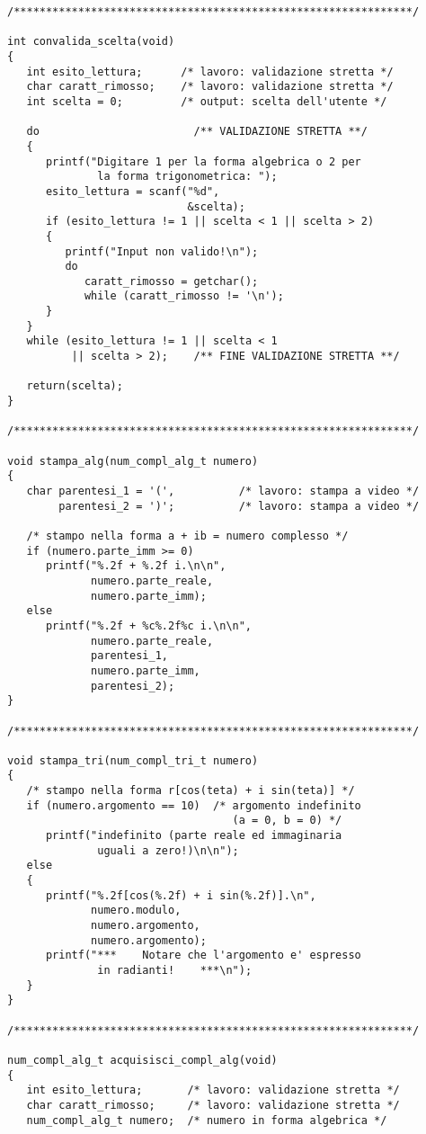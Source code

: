 \documentclass[a4paper,10pt]{article}
\begin{document}
\begin{verbatim}
/**************************************************************/

int convalida_scelta(void)
{
   int esito_lettura;      /* lavoro: validazione stretta */
   char caratt_rimosso;    /* lavoro: validazione stretta */
   int scelta = 0;         /* output: scelta dell'utente */

   do                        /** VALIDAZIONE STRETTA **/
   {
      printf("Digitare 1 per la forma algebrica o 2 per
              la forma trigonometrica: ");
      esito_lettura = scanf("%d",
                            &scelta);
      if (esito_lettura != 1 || scelta < 1 || scelta > 2)
      {
         printf("Input non valido!\n");
         do
            caratt_rimosso = getchar();
            while (caratt_rimosso != '\n');
      }
   }
   while (esito_lettura != 1 || scelta < 1
          || scelta > 2);    /** FINE VALIDAZIONE STRETTA **/

   return(scelta);
}

/**************************************************************/

void stampa_alg(num_compl_alg_t numero)
{
   char parentesi_1 = '(',          /* lavoro: stampa a video */
        parentesi_2 = ')';          /* lavoro: stampa a video */
	
   /* stampo nella forma a + ib = numero complesso */
   if (numero.parte_imm >= 0)
      printf("%.2f + %.2f i.\n\n",
             numero.parte_reale,
             numero.parte_imm);
   else
      printf("%.2f + %c%.2f%c i.\n\n",
             numero.parte_reale,
             parentesi_1,
             numero.parte_imm,
             parentesi_2);
}

/**************************************************************/

void stampa_tri(num_compl_tri_t numero)
{
   /* stampo nella forma r[cos(teta) + i sin(teta)] */
   if (numero.argomento == 10)	/* argomento indefinito
                                   (a = 0, b = 0) */
      printf("indefinito (parte reale ed immaginaria
              uguali a zero!)\n\n");
   else
   {
      printf("%.2f[cos(%.2f) + i sin(%.2f)].\n",
             numero.modulo,
             numero.argomento,
             numero.argomento);
      printf("***    Notare che l'argomento e' espresso
              in radianti!    ***\n");
   }
}

/**************************************************************/

num_compl_alg_t acquisisci_compl_alg(void)
{
   int esito_lettura;       /* lavoro: validazione stretta */
   char caratt_rimosso;     /* lavoro: validazione stretta */
   num_compl_alg_t numero;  /* numero in forma algebrica */


\end{verbatim}
\end{document}
